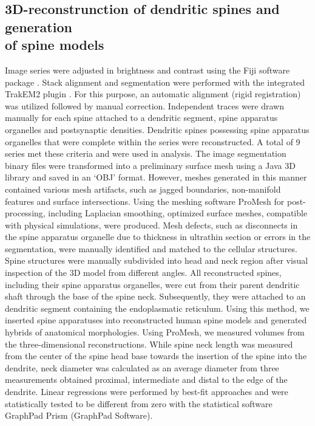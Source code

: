 \documentclass[12pt]{article}
\begin{document}
\subsection*{3D-reconstrunction of dendritic spines and generation \\ of spine models} Image series were adjusted in brightness and contrast using the Fiji software package \cite{Schindelin2012}. Stack alignment and segmentation were performed with the integrated TrakEM2 plugin \cite{Cardona2012}. For this purpose, an automatic alignment (rigid registration) was utilized followed by manual correction. Independent traces were drawn manually for each spine attached to a dendritic segment, spine apparatus organelles and postsynaptic densities. Dendritic spines possessing spine apparatus organelles that were complete within the series were reconstructed. A total of 9 series met these criteria and were used in analysis. The image segmentation binary files were transformed into a preliminary surface mesh using a Java 3D library \cite{Schmid2010} and saved in an `OBJ' format. However, meshes generated in this manner contained various mesh artifacts, such as jagged boundaries, non-manifold features and surface intersections. Using the meshing software ProMesh \cite{Reiter2012} for post-processing, including Laplacian smoothing, optimized surface meshes, compatible with physical simulations, were produced. Mesh defects, such as disconnects in the spine apparatus organelle due to thickness in ultrathin section or errors in the segmentation, were manually identified and matched to the cellular structures. Spine structures were manually subdivided into head and neck region after visual inspection of the 3D model from different angles. All reconstructed spines, including their spine apparatus organelles, were cut from their parent dendritic shaft through the base of the spine neck. Subsequently, they were attached to an dendritic segment containing the endoplasmatic reticulum. Using this method, we inserted spine apparatuses into reconstructed human spine models and generated hybrids of anatomical morphologies. Using ProMesh, we measured volumes from the three-dimensional reconstructions. While spine neck length was measured from the center of the spine head base towards the insertion of the spine into the dendrite, neck diameter was calculated as an average diameter from three measurements obtained proximal, intermediate and distal to the edge of the dendrite. Linear regressions were performed by best-fit approaches and were statistically tested to be different from zero with the statistical software GraphPad Prism (GraphPad Software).
\end{document}
